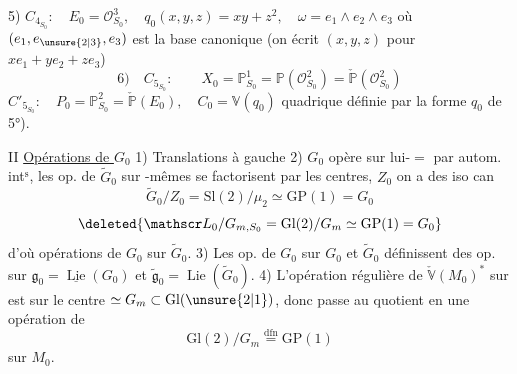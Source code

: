 5) $C_{4_{S_0}}:\quad E_0=\mathcal O_{S_0}^3,\quad q_0(x,y,z)=xy+z^2,\quad\omega=e_1\wedge e_2\wedge e_3$ où $(e_1,e_{\unsure{2|3}},e_3)$ est la base canonique (on écrit $(x,y,z)$ pour $xe_1+ye_2+ze_3$)
\[
 6)\quad C_{5_{S_0}}:\qquad X_0=\mathbb P^1_{S_0}=\mathbb P(\mathcal O_{S_0}^2)=\check{\mathbb P}(\mathcal O_{S_0}^2)
\]
$C'_{5_{S_0}}:\quad P_0=\mathbb P^2_{S_0}=\check{\mathbb P}(E_0),\quad C_0=\mathbb V(q_0)$ quadrique définie par la forme $q_0$ de 5°).

II \uline{Opérations de $G_0$}
1) Translations à gauche
2) $G_0$ opère sur lui-$=$ par autom. int$^{\mathrm s}$, les op. de $\widetilde G_0$  sur -mêmes se factorisent par les centres, $Z_0$  on a des  iso can
\[
 \widetilde G_0/Z_0=\mathrm{Sl}(2)/\mu_2\simeq\mathrm{GP}(1)=G_0\tag*{(1)}
\]
\[
 \deleted{\mathscr L_0/G_{m,S_0}=\mathrm{Gl}(2)/G_m\simeq\mathrm{GP}(1)=G_0}
\]
d'où opérations de $G_0$ sur $\widetilde G_0$. 
3) Les op. de $G_0$ sur $G_0$ et $\widetilde G_0$ définissent des op. sur $\mathfrak g_0=\underline{\operatorname{Lie}}(G_0)$ et $\widetilde{\mathfrak g}_0=\operatorname{Lie}(\widetilde G_0)$.
4) L'opération régulière de $\check{\mathbb V}(M_0)^*$  sur   est  sur le centre $\simeq G_m\subset\mathrm{Gl}(\unsure{2|1})$, donc passe au quotient en une opération de
\[
 \mathrm{Gl}(2)/G_m\overset{\mathrm{dfn}}{=}\mathrm{GP}(1)\tag*{(2)}
\]
sur $M_0$.
